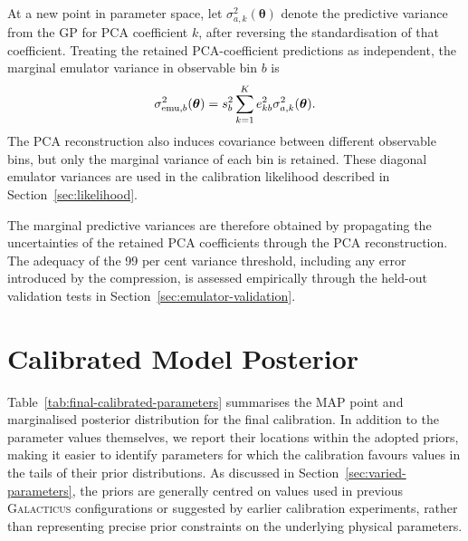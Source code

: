 \documentclass[twocolumn, apj, numberedappendix, iop]{openjournal}
\newcommand{\galacticus}{\textsc{Galacticus}\xspace}
\begin{document}
At a new point in parameter space, let
\(\sigma_{a,k}^2(\boldsymbol{\theta})\) denote the predictive variance from the
GP for PCA coefficient \(k\), after reversing the standardisation of that
coefficient. Treating the retained PCA-coefficient predictions as independent,
the marginal emulator variance in observable bin \(b\) is
\begin{equation}
  \sigma_{{\rm emu},b}^2(\boldsymbol{\theta})
  =
  s_b^2
  \sum_{k=1}^{K}
  e_{kb}^2
  \sigma_{a,k}^2(\boldsymbol{\theta}).
  \label{eq:pca-predictive-variance}
\end{equation}
The PCA reconstruction also induces covariance between different observable
bins, but only the marginal variance of each bin is retained. These diagonal
emulator variances are used in the calibration likelihood described in
Section~\ref{sec:likelihood}.

The marginal predictive variances are therefore obtained by propagating the
uncertainties of the retained PCA coefficients through the PCA reconstruction.
The adequacy of the 99 per cent variance threshold, including any error
introduced by the compression, is assessed empirically through the held-out
validation tests in Section~\ref{sec:emulator-validation}.



\section{Calibrated Model Posterior}
\label{app:calibrated-model}

Table~\ref{tab:final-calibrated-parameters} summarises the MAP point and
marginalised posterior distribution for the final calibration. In addition
to the parameter values themselves, we report their locations within the
adopted priors, making it easier to identify parameters for which the
calibration favours values in the tails of their prior distributions. As
discussed in Section~\ref{sec:varied-parameters}, the priors are generally
centred on values used in previous \galacticus{} configurations or suggested
by earlier calibration experiments, rather than representing precise prior
constraints on the underlying physical parameters.


\end{document}
